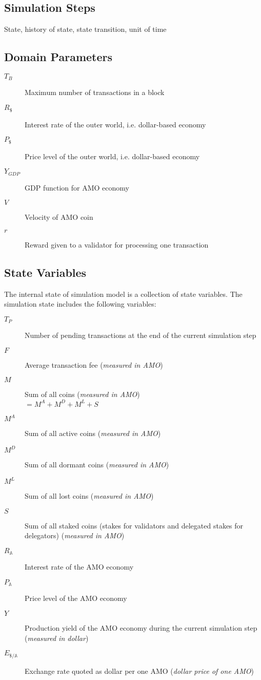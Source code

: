 \documentclass[a4paper,11pt]{scrartcl}
\newcommand{\amom}{\mathbb{A}}
\begin{document}
\subsection{Simulation Steps}
State, history of state, state transition, unit of time

\subsection{Domain Parameters}
\begin{description}
	\item[$T_B$] Maximum number of transactions in a block
	\item[$R_\$$] Interest rate of the outer world, i.e. dollar-based economy
	\item[$P_\$$] Price level of the outer world, i.e. dollar-based economy
	\item[$Y_{GDP}$] GDP function for AMO economy
	\item[$V$] Velocity of AMO coin
	\item[$r$] Reward given to a validator for processing one transaction
\end{description}

\subsection{State Variables}
The internal state of simulation model is a collection of state variables. The
simulation state includes the following variables:
\begin{description}
	\item[$T_P$] Number of pending transactions at the end of the current
		simulation step
	\item[$F$] Average transaction fee (\emph{measured in AMO})
	\item[$M$] Sum of all coins (\emph{measured in AMO}) \\
		$= M^A + M^D + M^L + S$
	\item[$M^A$] Sum of all active coins (\emph{measured in AMO})
	\item[$M^D$] Sum of all dormant coins (\emph{measured in AMO})
	\item[$M^L$] Sum of all lost coins (\emph{measured in AMO})
	\item[$S$] Sum of all staked coins (stakes for validators and
		delegated stakes for delegators) (\emph{measured in AMO})
	\item[$R_\amom$] Interest rate of the AMO economy
	\item[$P_\amom$] Price level of the AMO economy
	\item[$Y$] Production yield of the AMO economy during the current
		simulation step (\emph{measured in dollar})
	\item[$E_{\$/\amom}$] Exchange rate quoted as dollar per one AMO
		(\emph{dollar price of one AMO})
\end{description}
\end{document}
